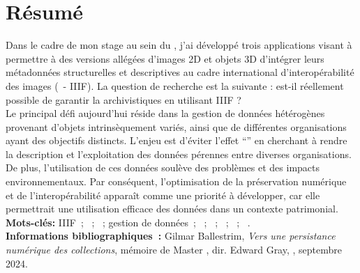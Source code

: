 \chapter*{Résumé}
\medskip
        Dans le cadre de mon stage au sein du \dsc, j'ai développé trois applications visant à permettre à des versions allégées d'images 2D et objets 3D d'intégrer leurs métadonnées structurelles et descriptives au cadre international d'interopérabilité des images (\iiif~- IIIF). La question de recherche est la suivante : est-il réellement possible de garantir la \psdn archivistiques en utilisant IIIF ?\\
        
        Le principal défi aujourd'hui réside dans la gestion de données hétérogènes provenant d'objets intrinsèquement variés, ainsi que de différentes organisations ayant des objectifs distincts. L'enjeu est d'éviter l'effet \enquote{} en cherchant à rendre la description et l'exploitation des données pérennes entre diverses organisations. De plus, l'utilisation de ces données soulève des problèmes et des impacts environnementaux. Par conséquent, l'optimisation de la préservation numérique et de l'interopérabilité apparaît comme une priorité à développer, car elle permettrait une utilisation efficace des données dans un contexte patrimonial.\\

        \textbf{Mots-clés:} IIIF~; \psdn~; \gco~; gestion de données~; \py~; \html~; \css~; \JS~; \fe~.\\
	
    	\textbf{Informations bibliographiques~:} Gilmar Ballestrim, \textit{Vers une persistance numérique des collections}, mémoire de Master , dir. Edward Gray, \enc, septembre 2024.
